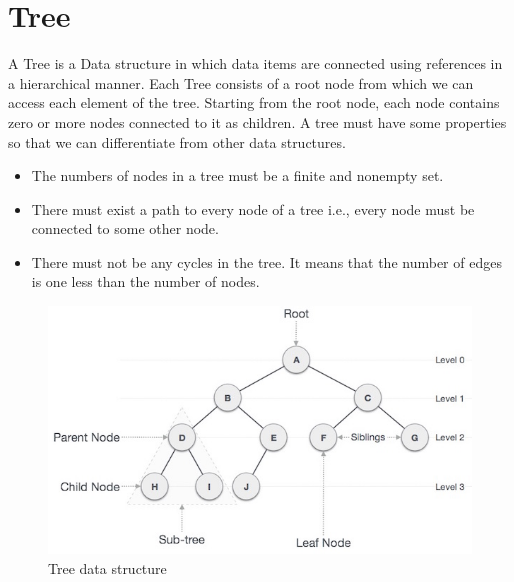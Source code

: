 \documentclass[a4paper,11pt]{book}
\begin{document}
\newpage
\section{Tree}
\noindent A Tree is a Data structure in which data items are connected using references in a hierarchical manner. Each Tree consists of a root node from which we can access each element of the tree. Starting from the root node, each node contains zero or more nodes connected to it as children. A tree must have some properties so that we can differentiate from other data structures. 
\begin{itemize}
    \item The numbers of nodes in a tree must be a finite and nonempty set.
    \item There must exist a path to every node of a tree i.e., every node must be connected to some other node.
    \item There must not be any cycles in the tree. It means that the number of edges is one less than the number of nodes. 
\end{itemize}

\begin{figure}[ht]
	\centering
	\includegraphics[scale=0.5]{code/sort/pic/binary_tree.jpg}
	\caption{Tree data structure}
\end{figure}
\end{document}
